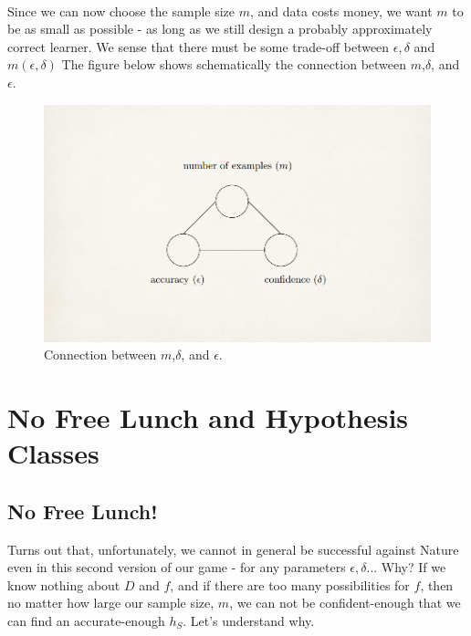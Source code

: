 \documentclass[11pt]{article}
\begin{document}
~\\
Since we can now choose the sample size $m$, and data costs money, we want $m$ to be as small as possible - as long as we still design a probably approximately correct learner. We sense that there must be some trade-off between $\epsilon,\delta$ and $m(\epsilon,\delta)$
The figure below shows schematically the connection between $m$,$\delta$, and $\epsilon$.

\begin{figure}[h!]
  \centering
    \includegraphics[scale=0.3]{m_eps_del.png}
    \caption{Connection between $m$,$\delta$, and $\epsilon$.}
\end{figure}


\section{No Free Lunch and Hypothesis Classes}




\subsection{No Free Lunch!}

Turns out that, unfortunately, we cannot in general be successful against Nature even in this second version of our game - for any parameters $\epsilon,\delta$...
Why? If we know nothing about $D$ and $f$, and if there are too many possibilities for $f$, then no matter how large our sample size, $m$, we can not be confident-enough that we can find an accurate-enough $h_S$. Let's understand why.
\vspace{5mm}
\end{document}
